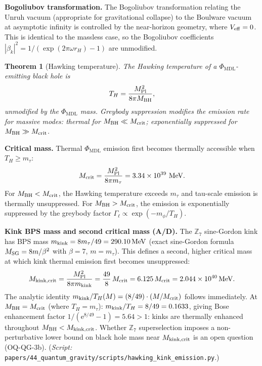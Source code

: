 \documentclass[11pt]{article}
\newtheorem{theorem}{Theorem}[section]
\theoremstyle{remark}
\newcommand{\PHIMDL}{\Phi_{\mathrm{MDL}}}
\newcommand{\MPl}{M_{\rm Pl}}
\newcommand{\CatAD}{\textbf{A/D}}
\begin{document}
\smallskip\noindent\textbf{Bogoliubov transformation.}  The Bogoliubov transformation
relating the Unruh vacuum (appropriate for gravitational collapse) to the Boulware vacuum
at asymptotic infinity is controlled by the near-horizon geometry, where $V_{\rm eff}=0$.
This is identical to the massless case, so the Bogoliubov coefficients
$|\beta_k|^2 = 1/(\exp(2\pi\omega r_H)-1)$ are unmodified.

\begin{theorem}[Hawking temperature]
\label{thm:hawking}
The Hawking temperature of a $\PHIMDL$-emitting black hole is
\begin{equation}
  T_H = \frac{\MPl^2}{8\pi M_{\rm BH}},
  \label{eq:TH}
\end{equation}
unmodified by the $\PHIMDL$ mass.  Greybody suppression modifies the emission rate for
massive modes: thermal for $M_{\rm BH}\ll M_{\rm crit}$; exponentially suppressed for
$M_{\rm BH}\gg M_{\rm crit}$.
\end{theorem}

\smallskip\noindent\textbf{Critical mass.}  Thermal $\PHIMDL$ emission first becomes
thermally accessible when $T_H \geq m_\tau$:
\begin{equation}
  M_{\rm crit} = \frac{\MPl^2}{8\pi m_\tau} = 3.34\times10^{39}~\text{MeV}.
  \label{eq:Mcrit}
\end{equation}
For $M_{\rm BH} < M_{\rm crit}$, the Hawking temperature exceeds $m_\tau$ and tau-scale
emission is thermally unsuppressed.  For $M_{\rm BH} > M_{\rm crit}$, the emission is
exponentially suppressed by the greybody factor $\Gamma_{\ell}\propto
\exp(-m_\phi/T_H)$.

\smallskip\noindent\textbf{Kink BPS mass and second critical mass (\CatAD).}
The $\mathbb{Z}_7$ sine-Gordon kink has BPS mass $m_{\rm kink} = 8m_\tau/49 = 290.10\,\text{MeV}$
(exact sine-Gordon formula $M_{\rm SG} = 8m/\beta^2$ with $\beta=7$, $m=m_\tau$).
This defines a second, higher critical mass at which kink thermal emission first
becomes unsuppressed:
\begin{equation}
  M_{\rm kink,crit} = \frac{\MPl^2}{8\pi m_{\rm kink}}
  = \frac{49}{8}\,M_{\rm crit} = 6.125\,M_{\rm crit}
  = 2.044\times10^{40}\,\text{MeV}.
\end{equation}
The analytic identity $m_{\rm kink}/T_H(M) = (8/49)\cdot(M/M_{\rm crit})$ follows
immediately.  At $M_{\rm BH} = M_{\rm crit}$ (where $T_H = m_\tau$):
$m_{\rm kink}/T_H = 8/49 = 0.1633$, giving Bose enhancement factor
$1/(\mathrm{e}^{8/49}-1) = 5.64 > 1$: kinks are thermally enhanced throughout
$M_{\rm BH} < M_{\rm kink,crit}$.  Whether $\mathbb{Z}_7$ superselection imposes a
non-perturbative lower bound on black hole mass near $M_{\rm kink,crit}$ is an
open question (OQ-QG-3b).
(\textit{Script:} \texttt{papers/44\_quantum\_gravity/scripts/hawking\_kink\_emission.py}.)
\end{document}
